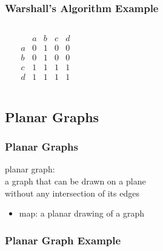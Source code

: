 \documentclass[dvipsnames]{beamer}
\begin{document}
\begin{frame}
  \frametitle{Warshall's Algorithm Example}

  \begin{example}
    \begin{columns}
      \begin{center}
      \end{center}

      \[
        \begin{array}{c|cccc}
              & a & b & c & d\\\hline
            a & 0 & 1 & 0 & 0\\
            b & 0 & 1 & 0 & 0\\
            c & 1 & 1 & 1 & 1\\
            d & 1 & 1 & 1 & 1
        \end{array}
      \]
    \end{columns}
  \end{example}
\end{frame}

\subsection{Planar Graphs}

\begin{frame}
  \frametitle{Planar Graphs}

  \begin{definition}
    \alert{planar graph}:\\
    a graph that can be drawn on a plane\\
    without any intersection of its edges

    \begin{itemize}
      \item \alert{map}: a planar drawing of a graph
    \end{itemize}
  \end{definition}
\end{frame}

\begin{frame}
  \frametitle{Planar Graph Example}

  \begin{example}[$K_4$]
    \begin{columns}
      \begin{center}
      \end{center}

      \begin{center}
      \end{center}
    \end{columns}
  \end{example}
\end{frame}
\end{document}
